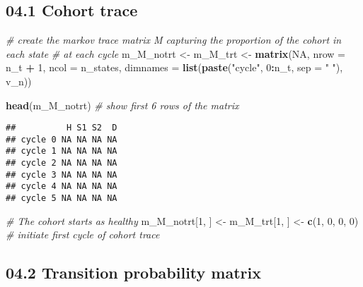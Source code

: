 \documentclass[
]{article}
\newenvironment{Shaded}{\begin{snugshade}}{\end{snugshade}}
\newcommand{\CommentTok}[1]{\textcolor[rgb]{0.56,0.35,0.01}{\textit{#1}}}
\newcommand{\DataTypeTok}[1]{\textcolor[rgb]{0.13,0.29,0.53}{#1}}
\newcommand{\DecValTok}[1]{\textcolor[rgb]{0.00,0.00,0.81}{#1}}
\newcommand{\KeywordTok}[1]{\textcolor[rgb]{0.13,0.29,0.53}{\textbf{#1}}}
\newcommand{\NormalTok}[1]{#1}
\newcommand{\OperatorTok}[1]{\textcolor[rgb]{0.81,0.36,0.00}{\textbf{#1}}}
\newcommand{\OtherTok}[1]{\textcolor[rgb]{0.56,0.35,0.01}{#1}}
\newcommand{\StringTok}[1]{\textcolor[rgb]{0.31,0.60,0.02}{#1}}
\begin{document}
\hypertarget{cohort-trace}{%
\subsection{04.1 Cohort trace}\label{cohort-trace}}

\begin{Shaded}
\begin{Highlighting}[]
\CommentTok{# create the markov trace matrix M capturing the proportion of the cohort in each state }
\CommentTok{# at each cycle}
\NormalTok{m_M_notrt <-}\StringTok{ }\NormalTok{m_M_trt <-}\StringTok{ }\KeywordTok{matrix}\NormalTok{(}\OtherTok{NA}\NormalTok{, }
                               \DataTypeTok{nrow     =}\NormalTok{ n_t }\OperatorTok{+}\StringTok{ }\DecValTok{1}\NormalTok{, }\DataTypeTok{ncol =}\NormalTok{ n_states,}
                               \DataTypeTok{dimnames =} \KeywordTok{list}\NormalTok{(}\KeywordTok{paste}\NormalTok{(}\StringTok{"cycle"}\NormalTok{, }\DecValTok{0}\OperatorTok{:}\NormalTok{n_t, }\DataTypeTok{sep =} \StringTok{" "}\NormalTok{), v_n))}

\KeywordTok{head}\NormalTok{(m_M_notrt) }\CommentTok{# show first 6 rows of the matrix }
\end{Highlighting}
\end{Shaded}

\begin{verbatim}
##          H S1 S2  D
## cycle 0 NA NA NA NA
## cycle 1 NA NA NA NA
## cycle 2 NA NA NA NA
## cycle 3 NA NA NA NA
## cycle 4 NA NA NA NA
## cycle 5 NA NA NA NA
\end{verbatim}

\begin{Shaded}
\begin{Highlighting}[]
\CommentTok{# The cohort starts as healthy}
\NormalTok{m_M_notrt[}\DecValTok{1}\NormalTok{, ] <-}\StringTok{ }\NormalTok{m_M_trt[}\DecValTok{1}\NormalTok{, ] <-}\StringTok{ }\KeywordTok{c}\NormalTok{(}\DecValTok{1}\NormalTok{, }\DecValTok{0}\NormalTok{, }\DecValTok{0}\NormalTok{, }\DecValTok{0}\NormalTok{) }\CommentTok{# initiate first cycle of cohort trace }
\end{Highlighting}
\end{Shaded}

\hypertarget{transition-probability-matrix}{%
\subsection{04.2 Transition probability
matrix}\label{transition-probability-matrix}}
\end{document}
